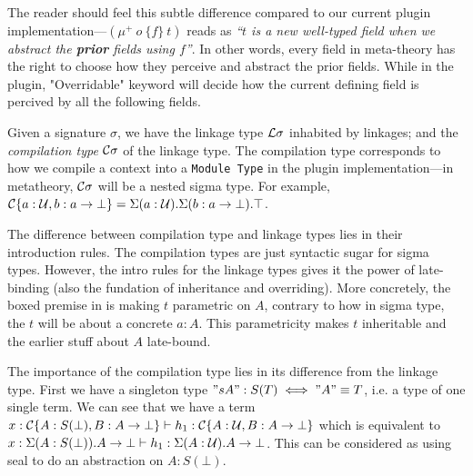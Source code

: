 The reader should feel this subtle difference compared to our current plugin implementation---$(\mu^+ ~o~\{f\}~t)$ reads as \textit{``$t$ is a new well-typed field when we abstract the \textbf{prior} fields using $f$''}. In other words, every field in meta-theory has the right to choose how they perceive and abstract the prior fields. While in the plugin, "Overridable" keyword will decide how the current defining field is percived by all the following fields.


Given a signature $\sigma$, we have the linkage type ${\mathcal{L}}\sigma$ inhabited by linkages; and the \textit{compilation type} ${\mathcal{C}}\sigma$ of the linkage type. The compilation type corresponds to how we compile a context into a \texttt{Module Type} in the plugin implementation---in metatheory, ${\mathcal{C}}\sigma$ will be a nested sigma type. For example, ${\mathcal{C}}\{a : {\mathcal{U}}, b : a \to \bot \} = \Sigma(a : {\mathcal{U}}).\Sigma (b : a \to \bot). \top$.


The difference between compilation type and linkage types lies in their introduction rules. The compilation types are just syntactic sugar for sigma types. However, the intro rules for the linkage types gives it the power of late-binding (also the fundation of inheritance and overriding). More concretely, the boxed premise in  is making $t$ parametric on $A$, contrary to how in sigma type, the $t$ will be about a concrete $a : A$. This parametricity makes $t$ inheritable and the earlier stuff about $A$ late-bound.


The importance of the compilation type lies in its difference from the linkage type. First we have a singleton type $"s A" : S(T) \iff "A" \equiv T$, i.e. a type of one single term.  We can see that we have a term $x : {\mathcal{C}}\{A : S(\bot), B : A \to \bot \} \vdash h_1 : {\mathcal{C}}\{A : {\mathcal{U}}, B:A \to \bot \}$ which is equivalent to $x : \Sigma (A: S(\bot)). A \to \bot \vdash h_1 : \Sigma (A: {\mathcal{U}}). A \to \bot$. This can be considered as using seal to do an abstraction on $A:S(\bot)$.

